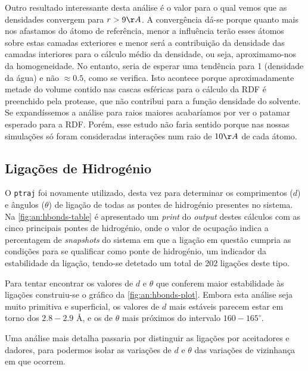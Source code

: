 \documentclass[12pt,a4paper]{article}
\begin{document}
	Outro resultado interessante desta análise é o valor para o qual vemos que as densidades convergem para $r>9\AA$. A convergência dá-se porque quanto mais nos afastamos do átomo de referência, menor a influência terão esses átomos sobre estas camadas exteriores e menor será a contribuição da densidade das camadas interiores para o cálculo médio da densidade, ou seja, aproximamo-nos da homogeneidade. No entanto, seria de esperar uma tendência para 1 (densidade da água) e não $\approx0.5$, como se verifica. Isto acontece porque aproximadamente metade do volume contido nas cascas esféricas para o cálculo da RDF é preenchido pela protease, que não contribui para a função densidade do solvente. Se expandíssemos a análise para raios maiores acabaríamos por ver o patamar esperado para a RDF. Porém, esse estudo não faria sentido porque nas nossas simulações só foram consideradas interações num raio de $10 \AA$ de cada átomo.
	
\subsection{Ligações de Hidrogénio}
	O \verb|ptraj| foi novamente utilizado, desta vez para determinar os comprimentos ($d$) e ângulos ($\theta$) de ligação de todas as pontes de hidrogénio presentes no sistema. Na \cref{fig:an:hbonds-table} é apresentado um \textit{print} do \textit{output} destes cálculos com as cinco principais pontes de hidrogénio, onde o valor de ocupação indica a percentagem de \textit{snapshots} do sistema em que a ligação em questão cumpria as condições para se qualificar como ponte de hidrogénio, um indicador da estabilidade da ligação, tendo-se detetado um total de 202 ligações deste tipo.
	
	Para tentar encontrar os valores de $d$ e $\theta$ que conferem maior estabilidade às ligações construiu-se o gráfico da \cref{fig:an:hbonds-plot}. Embora esta análise seja muito primitiva e superficial, os valores de $d$ mais estáveis parecem estar em torno dos $2.8 - 2.9$ \AA, e os de $\theta$ mais próximos do intervalo $160 - 165 ^{\circ}$.
	
	Uma análise mais detalha passaria por distinguir as ligações por aceitadores e dadores, para podermos isolar as variações de $d$ e $\theta$ das variações de vizinhança em que ocorrem.
	
\end{document}
